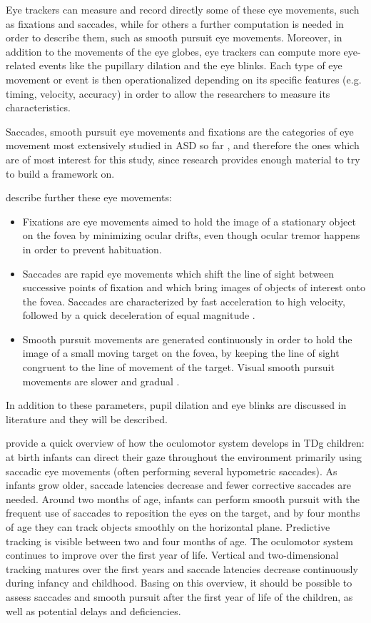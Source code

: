 Eye trackers can measure and record directly some of these eye movements, such as fixations and saccades, while for others a further computation is needed in order to describe them, such as smooth pursuit eye movements. Moreover, in addition to the movements of the eye globes, eye trackers can compute more eye-related events like the pupillary dilation and the eye blinks.
Each type of eye movement or event is then operationalized depending on its specific features (e.g. timing, velocity, accuracy) in order to allow the researchers to measure its characteristics.

Saccades, smooth pursuit eye movements and fixations are the categories of eye movement most extensively studied in ASD so far \citep{johnson2016review}, and therefore the ones which are of most interest for this study, since research provides enough material to try to build a framework on.

\citet[pp. 2, 170, 290]{leigh2015neurology} describe further these eye movements:
\begin{itemize}
    \item Fixations are eye movements aimed to hold the image of a stationary object on the fovea by minimizing ocular drifts, even though ocular tremor happens in order to prevent habituation.
    \item Saccades are rapid eye movements which shift the line of sight between successive points of fixation and which bring images of objects of interest onto the fovea. Saccades are characterized by fast acceleration to high velocity, followed by a quick deceleration of equal magnitude \citep{wilkes2015oculomotor}.
    \item Smooth pursuit movements are generated continuously in order to hold the image of a small moving target on the fovea, by keeping the line of sight congruent to the line of movement of the target. Visual smooth pursuit movements are slower and gradual \citep{wilkes2015oculomotor}.
\end{itemize}
In addition to these parameters, pupil dilation and eye blinks are discussed in literature and they will be described.

\cite{falck-ytter2013eyetrackingASD} provide a quick overview of how the oculomotor system develops in TDg children: at birth infants can direct their gaze throughout the environment primarily using saccadic eye movements (often performing several hypometric saccades). As infants grow older, saccade latencies decrease and fewer corrective saccades are needed. Around two months of age, infants can perform smooth pursuit with the frequent use of saccades to reposition the eyes on the target, and by four months of age they can track objects smoothly on the horizontal plane. Predictive tracking is visible between two and four months of age. The oculomotor system continues to improve over the first year of life. Vertical and two-dimensional tracking matures over the first years and saccade latencies decrease continuously during infancy and childhood. Basing on this overview, it should be possible to assess saccades and smooth pursuit after the first year of life of the children, as well as potential delays and deficiencies.

